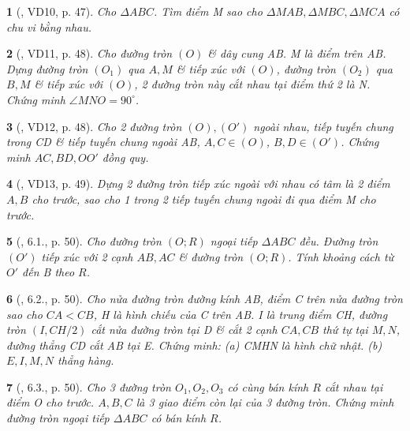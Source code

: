 \documentclass{article}
\newtheorem{baitoan}{}
\begin{document}
\begin{baitoan}[\cite{TLCT_THCS_Toan_9_hinh_hoc}, VD10, p. 47]
	Cho $\Delta ABC$. Tìm điểm M sao cho $\Delta MAB,\Delta MBC,\Delta MCA$ có chu vi bằng nhau.
\end{baitoan}

\begin{baitoan}[\cite{TLCT_THCS_Toan_9_hinh_hoc}, VD11, p. 48]
	Cho đường tròn $(O)$ \& dây cung AB. M là điểm trên AB. Dựng đường tròn $(O_1)$ qua $A,M$ \& tiếp xúc với $(O)$, đường tròn $(O_2)$ qua $B,M$ \& tiếp xúc với $(O)$, 2 đường tròn này cắt nhau tại điểm thứ 2 là N. Chứng minh $\angle{MNO} = 90^\circ$.
\end{baitoan}

\begin{baitoan}[\cite{TLCT_THCS_Toan_9_hinh_hoc}, VD12, p. 48]
	Cho 2 đường tròn $(O),(O')$ ngoài nhau, tiếp tuyến chung trong CD \& tiếp tuyến chung ngoài AB, $A,C\in(O)$, $B,D\in(O')$. Chứng minh $AC,BD,OO'$ đồng quy.
\end{baitoan}

\begin{baitoan}[\cite{TLCT_THCS_Toan_9_hinh_hoc}, VD13, p. 49]
	Dựng 2 đường tròn tiếp xúc ngoài với nhau có tâm là 2 điểm $A,B$ cho trước, sao cho 1 trong 2 tiếp tuyến chung ngoài đi qua điểm M cho trước.
\end{baitoan}

\begin{baitoan}[\cite{TLCT_THCS_Toan_9_hinh_hoc}, 6.1., p. 50]
	Cho đường tròn $(O;R)$ ngoại tiếp $\Delta ABC$ đều. Đường tròn $(O')$ tiếp xúc với 2 cạnh $AB,AC$ \& đường tròn $(O;R)$. Tính khoảng cách từ $O'$ đến B theo $R$.
\end{baitoan}

\begin{baitoan}[\cite{TLCT_THCS_Toan_9_hinh_hoc}, 6.2., p. 50]
	Cho nửa đường tròn đường kính AB, điểm C trên nửa đường tròn sao cho $CA < CB$, H là hình chiếu của C trên AB. I là trung điểm CH, đường tròn $(I,CH/2)$ cắt nửa đường tròn tại D \& cắt 2 cạnh $CA,CB$ thứ tự tại $M,N$, đường thẳng CD cắt AB tại E. Chứng minh: (a) CMHN là hình chữ nhật. (b) $E,I,M,N$ thẳng hàng.
\end{baitoan}

\begin{baitoan}[\cite{TLCT_THCS_Toan_9_hinh_hoc}, 6.3., p. 50]
	Cho 3 đường tròn $O_1,O_2,O_3$ có cùng bán kính $R$ cắt nhau tại điểm O cho trước. $A,B,C$ là 3 giao điểm còn lại của 3 đường tròn. Chứng minh đường tròn ngoại tiếp $\Delta ABC$ có bán kính $R$.
\end{baitoan}
\end{document}
